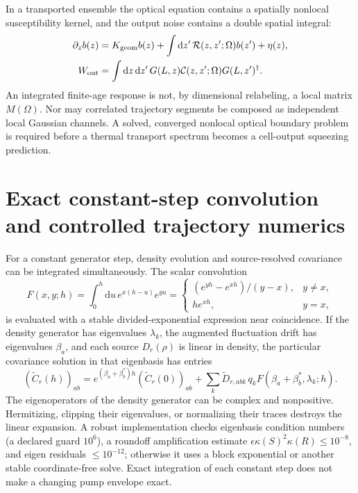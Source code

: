 \documentclass[11pt,a4paper]{article}
\newcommand{\dd}{\mathrm d}
\begin{document}
In a transported ensemble the optical equation contains a spatially nonlocal
susceptibility kernel, and the output noise contains a double spatial
integral:
\begin{align}
 \partial_z b(z)&=K_{\rm geom}b(z)+
   \int\dd z'\,\mathcal R(z,z';\Omega)b(z')+\eta(z),\nonumber\\
 W_{\rm out}&=\int\dd z\,\dd z'\,
 G(L,z)\mathcal C(z,z';\Omega)G(L,z')^\dagger.
 \label{eq:gc-nonlocal-maxwell}
\end{align}
An integrated finite-age response is not, by dimensional relabeling, a local
matrix $M(\Omega)$. Nor may correlated trajectory segments be composed as
independent local Gaussian channels. A solved, converged nonlocal optical
boundary problem is required before a thermal transport spectrum becomes a
cell-output squeezing prediction.

\section{Exact constant-step convolution and controlled trajectory numerics}
\label{sec:gc-numerics}

For a constant generator step, density evolution and source-resolved covariance
can be integrated simultaneously. The scalar convolution
\begin{equation}
 F(x,y;h)=\int_0^h\dd u\,e^{x(h-u)}e^{yu}
 =\begin{cases}(e^{yh}-e^{xh})/(y-x),&y\ne x,\\
 he^{xh},&y=x,
 \end{cases}
 \label{eq:gc-divided-exponential}
\end{equation}
is evaluated with a stable divided-exponential expression near coincidence.
If the density generator has eigenvalues $\lambda_k$, the augmented
fluctuation drift has eigenvalues $\beta_a$, and each source $D_r(\rho)$
is linear in density, the particular covariance solution in that eigenbasis
has entries
\begin{equation}
 (\widetilde C_r(h))_{ab}
 =e^{(\beta_a+\beta_b^*)h}(\widetilde C_r(0))_{ab}
 +\sum_k\widetilde D_{r,abk}\,q_k
      F(\beta_a+\beta_b^*,\lambda_k;h).
 \label{eq:gc-exact-step}
\end{equation}
The eigenoperators of the density generator can be complex and nonpositive.
Hermitizing, clipping their eigenvalues, or normalizing their traces destroys
the linear expansion. A robust implementation checks eigenbasis condition
numbers (a declared guard $10^6$), a roundoff amplification estimate
$\epsilon\kappa(S)^2\kappa(R)\leq10^{-8}$, and eigen residuals
$\leq10^{-12}$; otherwise it uses a block exponential or another stable
coordinate-free solve. Exact integration of each constant step does not make
a changing pump envelope exact.
\end{document}
